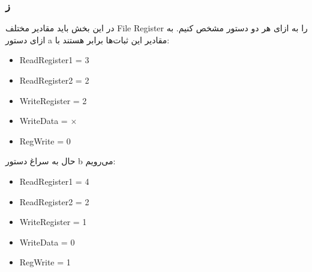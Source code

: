 \subsubsection*{ز}

در این بخش باید مقادیر مختلف File Register را به ازای هر دو دستور مشخص کنیم. به ازای دستور a مقادیر این ثبات‌ها برابر هستند با:

\setLTR

\begin{itemize}
	\item ReadRegister1 = 3
	\item ReadRegister2 = 2
	\item WriteRegister = 2
	\item WriteData = $\times$
	\item RegWrite = 0
\end{itemize}
\setRTL


حال به سراغ دستور b می‌رویم:

\setLTR

\begin{itemize}
	\item ReadRegister1 = 4
	\item ReadRegister2 = 2
	\item WriteRegister = 1
	\item WriteData = 0
	\item RegWrite = 1
\end{itemize}

\setRTL
